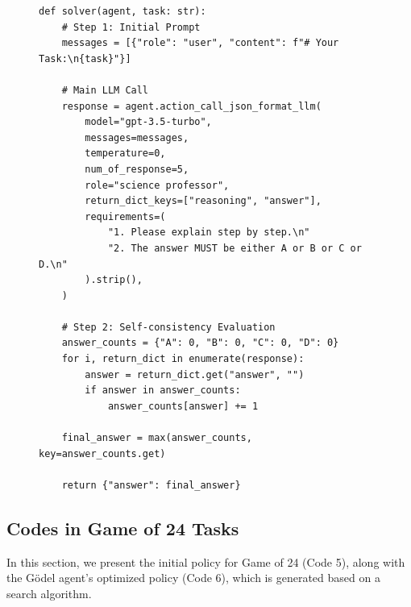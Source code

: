 \begin{figure}[ht]
\begin{lstlisting}[style=pythonstyle, caption={Code of the best policy found by \framework for GPQA.}]
def solver(agent, task: str):
    # Step 1: Initial Prompt
    messages = [{"role": "user", "content": f"# Your Task:\n{task}"}]
    
    # Main LLM Call
    response = agent.action_call_json_format_llm(
        model="gpt-3.5-turbo", 
        messages=messages, 
        temperature=0, 
        num_of_response=5,
        role="science professor", 
        return_dict_keys=["reasoning", "answer"], 
        requirements=(
            "1. Please explain step by step.\n"
            "2. The answer MUST be either A or B or C or D.\n"
        ).strip(), 
    )

    # Step 2: Self-consistency Evaluation
    answer_counts = {"A": 0, "B": 0, "C": 0, "D": 0}
    for i, return_dict in enumerate(response):
        answer = return_dict.get("answer", "")
        if answer in answer_counts:
            answer_counts[answer] += 1
    
    final_answer = max(answer_counts, key=answer_counts.get)

    return {"answer": final_answer}

\end{lstlisting}
\end{figure}



\subsection{Codes in Game of 24 Tasks}
\label{sec:code24}

In this section, we present the initial policy for Game of 24 (Code 5), along with the Gödel agent's optimized policy (Code 6), which is generated based on a search algorithm.


